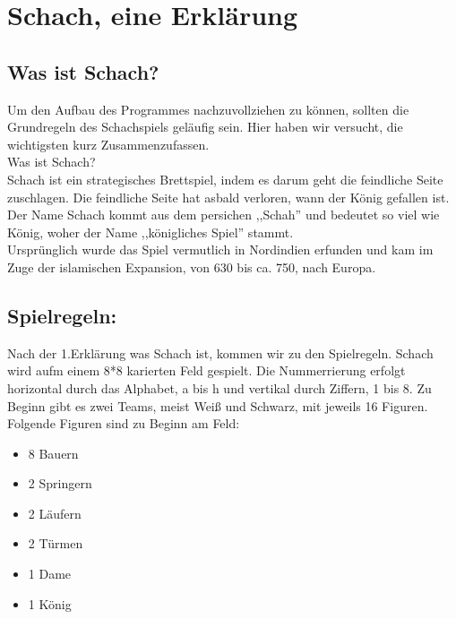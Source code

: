 \documentclass[12pt,a4paper]{article}
\begin{document}
{%
\clearpage\vfill\newpage{}

\section{Schach, eine Erklärung}
\subsection{Was ist Schach?}
Um den Aufbau des Programmes nachzuvollziehen zu können, sollten die Grundregeln des Schachspiels geläufig sein. Hier haben wir versucht, die wichtigsten kurz Zusammenzufassen. \\
Was ist Schach? \\
Schach ist ein strategisches Brettspiel, indem es darum geht die feindliche Seite zuschlagen. Die feindliche Seite hat asbald verloren, wann der König gefallen ist. \\
Der Name Schach kommt aus dem persichen ,,Schah'' und bedeutet so viel wie König, woher der Name ,,königliches Spiel'' stammt. \\
Ursprünglich wurde das Spiel vermutlich in Nordindien erfunden und kam im Zuge der islamischen Expansion, von 630 bis ca. 750, nach Europa.


\subsection{Spielregeln:}

Nach der 1.Erklärung was Schach ist, kommen wir zu den Spielregeln.
Schach wird aufm einem 8*8 karierten Feld gespielt. Die Nummerrierung erfolgt horizontal durch das Alphabet, a bis h und vertikal durch Ziffern, 1 bis 8.
Zu Beginn gibt es zwei Teams, meist Weiß und Schwarz, mit jeweils 16 Figuren.
Folgende Figuren sind zu Beginn am Feld:
\begin{itemize}
	\item{8 Bauern}
	\item{2 Springern}
	\item{2 Läufern}
	\item{2 Türmen}
	\item{1 Dame}
	\item{1 König}
\end{itemize}

}
\end{document}
